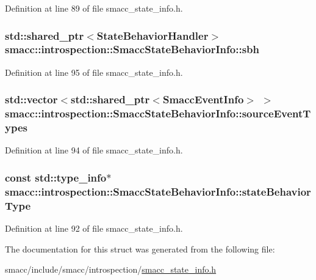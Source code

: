 Definition at line 89 of file smacc\+\_\+state\+\_\+info.\+h.

\subsubsection[{\texorpdfstring{sbh}{sbh}}]{\setlength{\rightskip}{0pt plus 5cm}std\+::shared\+\_\+ptr$<${\bf State\+Behavior\+Handler}$>$ smacc\+::introspection\+::\+Smacc\+State\+Behavior\+Info\+::sbh}\hypertarget{structsmacc_1_1introspection_1_1SmaccStateBehaviorInfo_a023a46dffcf0dc85c90281783a1c8dff}{}\label{structsmacc_1_1introspection_1_1SmaccStateBehaviorInfo_a023a46dffcf0dc85c90281783a1c8dff}


Definition at line 95 of file smacc\+\_\+state\+\_\+info.\+h.

\subsubsection[{\texorpdfstring{source\+Event\+Types}{sourceEventTypes}}]{\setlength{\rightskip}{0pt plus 5cm}std\+::vector$<$std\+::shared\+\_\+ptr$<${\bf Smacc\+Event\+Info}$>$ $>$ smacc\+::introspection\+::\+Smacc\+State\+Behavior\+Info\+::source\+Event\+Types}\hypertarget{structsmacc_1_1introspection_1_1SmaccStateBehaviorInfo_af4ad563a4b9ed8951ddd33732d466cf4}{}\label{structsmacc_1_1introspection_1_1SmaccStateBehaviorInfo_af4ad563a4b9ed8951ddd33732d466cf4}


Definition at line 94 of file smacc\+\_\+state\+\_\+info.\+h.

\subsubsection[{\texorpdfstring{state\+Behavior\+Type}{stateBehaviorType}}]{\setlength{\rightskip}{0pt plus 5cm}const std\+::type\+\_\+info$\ast$ smacc\+::introspection\+::\+Smacc\+State\+Behavior\+Info\+::state\+Behavior\+Type}\hypertarget{structsmacc_1_1introspection_1_1SmaccStateBehaviorInfo_a85dc84a01fbd0b830ed6598996c4a7c9}{}\label{structsmacc_1_1introspection_1_1SmaccStateBehaviorInfo_a85dc84a01fbd0b830ed6598996c4a7c9}


Definition at line 92 of file smacc\+\_\+state\+\_\+info.\+h.



The documentation for this struct was generated from the following file\+:\begin{DoxyCompactItemize}
\item 
smacc/include/smacc/introspection/\hyperlink{smacc__state__info_8h}{smacc\+\_\+state\+\_\+info.\+h}\end{DoxyCompactItemize}
